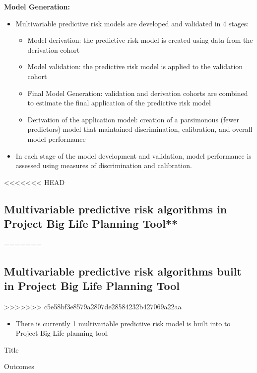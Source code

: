 \documentclass[]{book}
\providecommand{\tightlist}{%
  \setlength{\itemsep}{0pt}\setlength{\parskip}{0pt}}
\begin{document}
\textbf{Model Generation:}

\begin{itemize}
\item
  Multivariable predictive risk models are developed and validated in 4
  stages:

  \begin{itemize}
  \tightlist
  \item
    Model derivation: the predictive risk model is created using data
    from the derivation cohort
  \item
    Model validation: the predictive risk model is applied to the
    validation cohort
  \item
    Final Model Generation: validation and derivation cohorts are
    combined to estimate the final application of the predictive risk
    model
  \item
    Derivation of the application model: creation of a parsimonous
    (fewer predictors) model that maintained discrimination,
    calibration, and overall model performance
  \end{itemize}
\item
  In each stage of the model development and validation, model
  performance is assessed using measures of discrimination and
  calibration.
\end{itemize}

<<<<<<< HEAD
\subsection{Multivariable predictive risk algorithms in Project Big Life
Planning
Tool**}\label{multivariable-predictive-risk-algorithms-in-project-big-life-planning-tool}
=======
\subsection{Multivariable predictive risk algorithms built in Project
Big Life Planning
Tool}\label{multivariable-predictive-risk-algorithms-built-in-project-big-life-planning-tool}
>>>>>>> c5e58bf3e8579a2807de28584232b427069a22aa

\begin{itemize}
\tightlist
\item
  There is currently 1 multivariable predictive risk model is built into
  to Project Big Life planning tool.
\end{itemize}

Title

Outcomes
\end{document}
